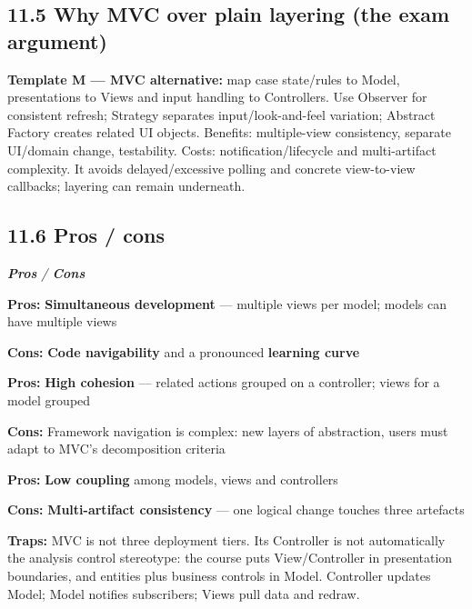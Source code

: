 \begin{studycolumns}
\vspace{0pt}
\subsection*{11.5 Why MVC over plain layering (the exam argument)}
\par\needspace{65pt}\label{answer-mvc}
\textbf{Template M --- MVC alternative:} map case state/\allowbreak{}rules to Model, presentations to Views and input handling to Controllers. Use Observer for consistent refresh; Strategy separates input/\allowbreak{}look-and-feel variation; Abstract Factory creates related UI objects. Benefits: multiple-view consistency, separate UI/\allowbreak{}domain change, testability. Costs: notification/\allowbreak{}lifecycle and multi-artifact complexity. It avoids delayed/\allowbreak{}excessive polling and concrete view-to-view callbacks; layering can remain underneath.
\subsection*{11.6 Pros /\allowbreak{} cons}
\begin{referenceentries}
\textit{\textbf{Pros} / \textbf{Cons}}\par\smallskip
\noindent \textbf{Pros:} \textbf{Simultaneous development} --- multiple views per model; models can have multiple views\par
\noindent \textbf{Cons:} \textbf{Code navigability} and a pronounced \textbf{learning curve}\par\smallskip
\noindent \textbf{Pros:} \textbf{High cohesion} --- related actions grouped on a controller; views for a model grouped\par
\noindent \textbf{Cons:} Framework navigation is complex: new layers of abstraction, users must adapt to MVC's decomposition criteria\par\smallskip
\noindent \textbf{Pros:} \textbf{Low coupling} among models, views and controllers\par
\noindent \textbf{Cons:} \textbf{Multi-artifact consistency} --- one logical change touches three artefacts\par\smallskip
\end{referenceentries}\textbf{Traps:} MVC is not three deployment tiers. Its Controller is not automatically the analysis control stereotype: the course puts View/\allowbreak{}Controller in presentation boundaries, and entities plus business controls in Model. Controller updates Model; Model notifies subscribers; Views pull data and redraw.
\end{studycolumns}
